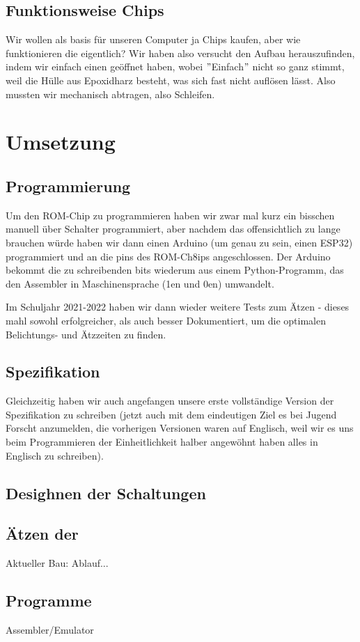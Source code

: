\documentclass{scrartcl}
\begin{document}
    \subsection{Funktionsweise Chips}
    Wir wollen als basis für unseren Computer ja Chips kaufen, aber wie funktionieren die eigentlich?
    Wir haben also versucht den Aufbau herauszufinden, indem wir einfach einen geöffnet haben, wobei $"$Einfach$"$ nicht so ganz stimmt, weil die Hülle aus Epoxidharz besteht, was sich fast nicht auflösen lässt.
    Also mussten wir mechanisch abtragen, also Schleifen.

    \section{Umsetzung}
    \subsection{Programmierung}
    Um den ROM-Chip zu programmieren haben wir zwar mal kurz ein bisschen manuell über Schalter programmiert, aber nachdem das offensichtlich zu lange brauchen würde haben wir dann einen Arduino (um genau zu sein, einen ESP32) programmiert und an die pins des ROM-Ch8ips angeschlossen.
    Der Arduino bekommt die zu schreibenden bits wiederum aus einem Python-Programm, das den Assembler in Maschinensprache (1en und 0en) umwandelt.

    Im Schuljahr 2021-2022 haben wir dann wieder weitere Tests zum Ätzen - dieses mahl sowohl erfolgreicher, als auch besser Dokumentiert, um die optimalen Belichtungs- und Ätzzeiten zu finden.

    \subsection{Spezifikation}
    Gleichzeitig haben wir auch angefangen unsere erste vollständige Version der Spezifikation zu schreiben (jetzt auch mit dem eindeutigen Ziel es bei Jugend Forscht anzumelden, die vorherigen Versionen waren auf Englisch, weil wir es uns beim Programmieren der Einheitlichkeit halber angewöhnt haben alles in Englisch zu schreiben).

    \subsection{Desighnen der Schaltungen}

    \subsection{Ätzen der }
    Aktueller Bau: Ablauf...
    \subsection{Programme}
    Assembler/Emulator
\end{document}
